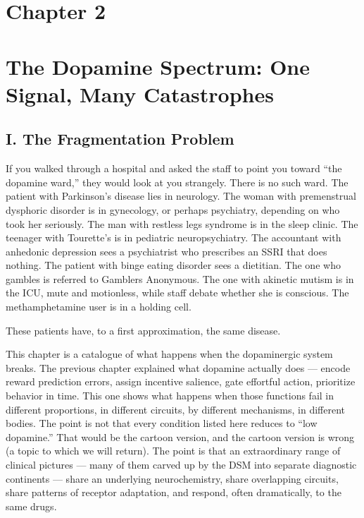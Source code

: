 ﻿\section{Chapter 2}\label{09_dopamine_spectrum-chapter-2}

\section{The Dopamine Spectrum: One Signal, Many Catastrophes}\label{09_dopamine_spectrum-the-dopamine-spectrum-one-signal-many-catastrophes}

\subsection{I. The Fragmentation Problem}\label{09_dopamine_spectrum-i.-the-fragmentation-problem}

If you walked through a hospital and asked the staff to point you toward ``the dopamine ward,'' they would look at you strangely. There is no such ward. The patient with Parkinson's disease lies in neurology. The woman with premenstrual dysphoric disorder is in gynecology, or perhaps psychiatry, depending on who took her seriously. The man with restless legs syndrome is in the sleep clinic. The teenager with Tourette's is in pediatric neuropsychiatry. The accountant with anhedonic depression sees a psychiatrist who prescribes an SSRI that does nothing. The patient with binge eating disorder sees a dietitian. The one who gambles is referred to Gamblers Anonymous. The one with akinetic mutism is in the ICU, mute and motionless, while staff debate whether she is conscious. The methamphetamine user is in a holding cell.

These patients have, to a first approximation, the same disease.

This chapter is a catalogue of what happens when the dopaminergic system breaks. The previous chapter explained what dopamine actually does --- encode reward prediction errors, assign incentive salience, gate effortful action, prioritize behavior in time. This one shows what happens when those functions fail in different proportions, in different circuits, by different mechanisms, in different bodies. The point is not that every condition listed here reduces to ``low dopamine.'' That would be the cartoon version, and the cartoon version is wrong (a topic to which we will return). The point is that an extraordinary range of clinical pictures --- many of them carved up by the DSM into separate diagnostic continents --- share an underlying neurochemistry, share overlapping circuits, share patterns of receptor adaptation, and respond, often dramatically, to the same drugs.

